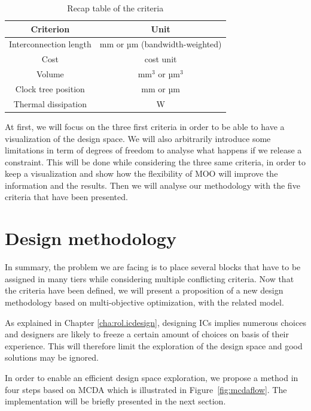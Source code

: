 \begin{table}
\caption{Recap table of the criteria}
\begin{center}
\begin{tabular}{|c|c|}
\hline
Criterion & Unit\\
\hline
Interconnection length & mm or µm (bandwidth-weighted)\\
Cost & cost unit\\
Volume & mm$^3$ or µm$^3$\\
Clock tree position & mm or µm\\
Thermal dissipation & W\\
\hline
\end{tabular}
\end{center}
\label{tab:critrecap}
\end{table}


At first, we will focus on the three first criteria in order to be able to have a visualization of the design space. We will also arbitrarily introduce some limitations in term of degrees of freedom to analyse what happens if we release a constraint. This will be done while considering the three same criteria, in order to keep a visualization and show how the flexibility of MOO will improve the information and the results. Then we will analyse our methodology with the five criteria that have been presented.

\section{Design methodology}
In summary, the problem we are facing is to place several blocks that have to be assigned in many tiers while considering multiple conflicting criteria. Now that the criteria have been defined, we will present a proposition of a new design methodology based on multi-objective optimization, with the related model.

As explained in Chapter \ref{cha:rol.icdesign}, designing ICs implies numerous choices and designers are likely to freeze a certain amount of choices on basis of their experience. This will therefore limit the exploration of the design space and good solutions may be ignored.

In order to enable an efficient design space exploration, we propose a method in four steps based on MCDA which is illustrated in Figure~\ref{fig:mcdaflow}. The implementation will be briefly presented in the next section.

